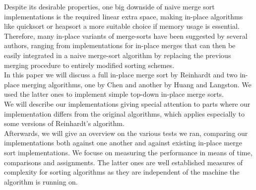\documentclass[11pt,pdftex,a4paper, twocolumn]{article}
\begin{document}
Despite its desirable properties, one big downside of naive merge sort implementations is the required linear extra space, making in-place algorithms like quicksort or heapsort a more suitable choice if memory usage is essential. \\
Therefore, many in-place variants of merge-sorts have been suggested by several authors, ranging from implementations for in-place merges that can then be easily integrated in a naive merge-sort algorithm by replacing the previous merging procedure to entirely modified sorting schemes. \\
In this paper we will discuss a full in-place merge sort by Reinhardt\cite{Reinhardt92} and two in-place merging algorithms, one by Chen\cite{Chen06} and another by Huang and Langston\cite{huang1988practical}. We used the latter ones to implement simple top-down in-place merge sorts. \\
We will describe our implementations giving special attention to parts where our implementation differs from the original algorithms, which applies especially to some versions of Reinhardt’s algorithm. \\
Afterwards, we will give an overview on the various tests we ran, comparing our implementations both against one another and against existing in-place merge sort implementations. We focuse on measuring the performance in means of time, comparisons and assignments. The latter ones are well established measures of complexity for sorting algorithms as they are independent of the machine the algorithm is running on. \\
\end{document}
